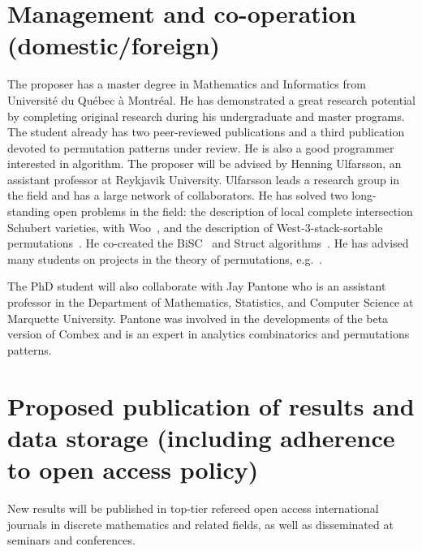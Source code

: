 \documentclass{rannis}
\newcommand{\motheralg}{\textsf{Combex}}
\newcommand{\bisc}{\textsf{BiSC}}
\newcommand{\struct}{\textsf{Struct}}
\theoremstyle{definition}
\begin{document}
\section{Management and co-operation (domestic/foreign)}
The proposer has a master degree in Mathematics and Informatics from
Universit\'e du Qu\'ebec \`a Montr\'eal. He has demonstrated a great research
potential by completing original research during his undergraduate and master
programs. The student already has two peer-reviewed publications and a third publication
devoted to permutation patterns under review.
He is also a
good programmer interested in algorithm.
The proposer will be advised by Henning Ulfarsson, an assistant professor
at Reykjavik University. Ulfarsson leads a research group in the field and has
a large network of collaborators.
He has solved two long-standing open
problems in the field: the description of local complete intersection Schubert
varieties, with Woo~\cite{UW11}, and the description of West-$3$-stack-sortable
permutations~\cite{MR2971010}. He co-created the
\bisc{}~\cite{BiSC} and \struct{} algorithms~\cite{algstruct, structpaper}.
He has advised many students on projects in the theory of permutations,
e.g.~\cite{WilfOfShort, parti, MagnussonMSC, MurrayMSC, TomasMSc, BeanPhd}.

The PhD student will also collaborate with Jay Pantone who is an
assistant professor in the Department of Mathematics, Statistics, and Computer
Science at Marquette University.  Pantone was involved in the developments of
the beta version of \motheralg{} and is an expert in analytics combinatorics and
permutations patterns.
\\

\section{Proposed publication of results and data storage (including adherence to open access policy)}
New results will be published in top-tier refereed open access
international journals in discrete mathematics and related fields, as well as
disseminated at seminars and conferences.
\\%
\label{LastPageOfDescription}
\clearpage
\setcounter{page}{1}
\renewcommand{\lastpageref}{\pageref{LastPage}}%




\end{document}
